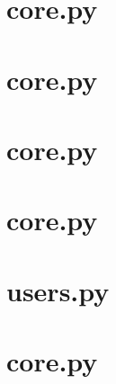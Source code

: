 \section{core\models.py}\label{code:core\models.py}

\section{core\webscraper.py}\label{code:core\webscraper.py}

\section{core\views.py}\label{code:core\views.py}

\section{core\urls.py}\label{code:core\urls.py}

\section{users\views.py}\label{code:users\views.py}

\section{core\webscraper.py}\label{code:core\webscraper.py}

